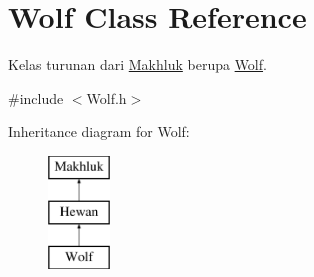 \hypertarget{class_wolf}{}\section{Wolf Class Reference}
\label{class_wolf}


Kelas turunan dari \hyperlink{class_makhluk}{Makhluk} berupa \hyperlink{class_wolf}{Wolf}.  




{\ttfamily \#include $<$Wolf.\+h$>$}

Inheritance diagram for Wolf\+:\begin{figure}[H]
\begin{center}
\leavevmode
\includegraphics[height=3.000000cm]{class_wolf}
\end{center}
\end{figure}
